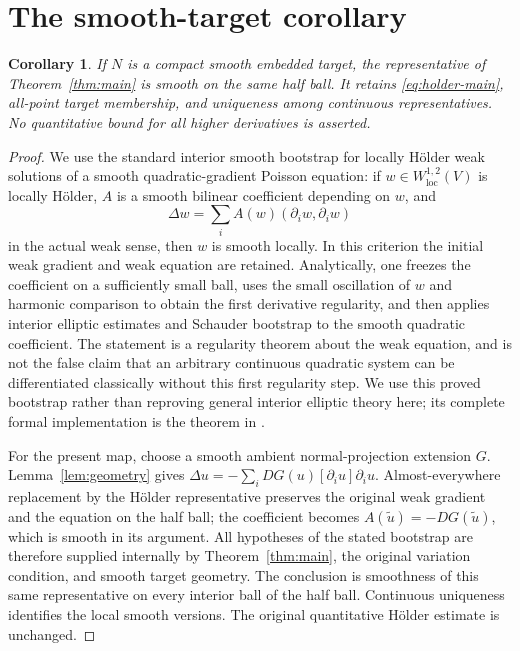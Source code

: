 \documentclass[reqno,11pt]{amsart}
\numberwithin{equation}{section}
\newtheorem{corollary}[theorem]{Corollary}
\theoremstyle{definition}
\theoremstyle{remark}
\newcommand{\loc}{\mathrm{loc}}
\begin{document}
\section{The smooth-target corollary}\label{sec:smooth}
\begin{corollary}\label{cor:smooth}
If $N$ is a compact smooth embedded target, the representative of
Theorem~\ref{thm:main} is smooth on the same half ball. It retains
\eqref{eq:holder-main}, all-point target membership, and uniqueness
among continuous representatives. No quantitative bound for all higher
derivatives is asserted.
\end{corollary}
\begin{proof}
We use the standard interior smooth bootstrap for locally H\"older
weak solutions of a smooth quadratic-gradient Poisson equation:
if $w\in W^{1,2}_{\loc}(V)$ is locally H\"older, $A$ is a smooth
bilinear coefficient depending on $w$, and
\[
 \Delta w=\sum_i A(w)(\partial_iw,\partial_iw)
\]
in the actual weak sense, then $w$ is smooth locally. In this criterion
the initial weak gradient and weak equation are retained. Analytically,
one freezes the coefficient on a sufficiently small ball, uses the
small oscillation of $w$ and harmonic comparison to obtain the first
derivative regularity, and then applies interior elliptic estimates and
Schauder bootstrap to the smooth quadratic coefficient. The statement
is a regularity theorem about the weak equation, and is not the false
claim that an arbitrary continuous quadratic system can be differentiated
classically without this first regularity step. We use this proved
bootstrap rather than reproving general interior elliptic theory here;
its complete formal implementation is the theorem
 in
.

For the present map, choose a smooth ambient normal-projection
extension $G$. Lemma~\ref{lem:geometry} gives
$\Delta u=-\sum_i DG(u)[\partial_i u]\partial_i u$.
Almost-everywhere replacement by the H\"older representative preserves
the original weak gradient and the equation on the half ball; the
coefficient becomes $A(\widetilde u)=-DG(\widetilde u)$, which is
smooth in its argument. All hypotheses of the stated bootstrap are
therefore supplied internally by Theorem~\ref{thm:main}, the original
variation condition, and smooth target geometry. The conclusion is
smoothness of this same representative on every interior ball of the
half ball. Continuous uniqueness identifies the local smooth versions.
The original quantitative H\"older estimate is unchanged.
\end{proof}
\end{document}
